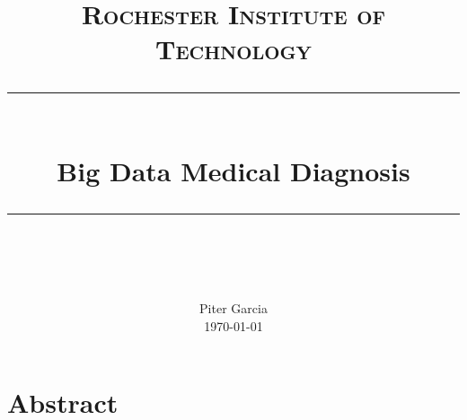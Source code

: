 \documentclass{sig-alternate}
\begin{document}
\newcommand{\horrule}[1]{\rule{\linewidth}{#1}} 	%

\title{
		\textbf{\normalfont\normalsize\textsc{Rochester Institute of Technology}} \\
		\horrule{0.5pt} \\[0.4cm]
		\textbf{\huge Big Data Medical Diagnosis} \\
		\horrule{2pt} \\[0.5cm]
		\vspace{-10mm}
}

\author{
		\normalfont\Large 
        Piter Garcia\\[0pt]\normalsize
        \today
}
\date{}
\maketitle


\section{Abstract}
\label{Abstract}
\end{document}
